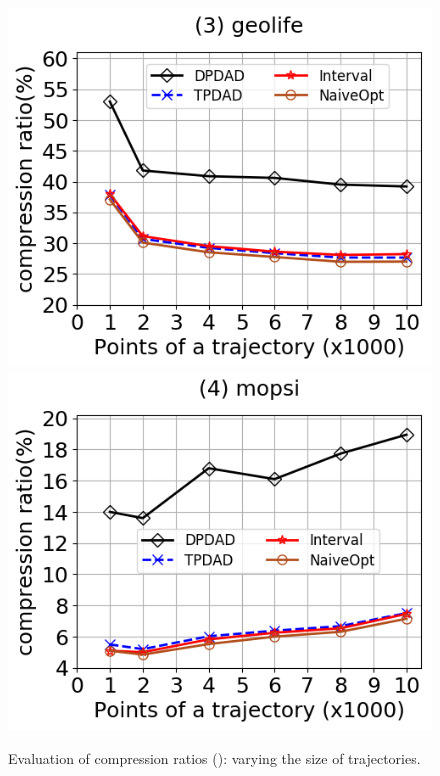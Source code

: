 \begin{figure}[tb!]
	\includegraphics[scale=0.315]{Figures/Exp-DAD-CR-size-geolife.png}	\hspace{1ex}
	\includegraphics[scale=0.315]{Figures/Exp-DAD-CR-size-mopsi.png}		
	\vspace{-3ex}
	\caption{\small Evaluation of compression ratios (\dad): varying the size of trajectories.}
	\label{fig:cr-dad-size}
	\vspace{-3ex}
\end{figure}



